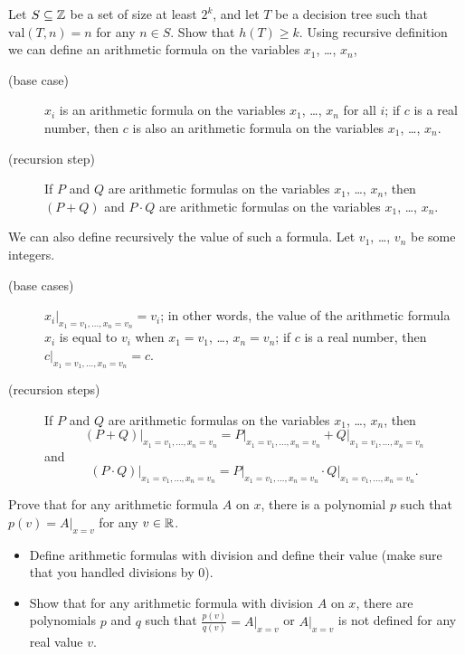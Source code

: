\begin{chapterendexercises}
  \exercise[recommended] Let $S \subseteq {\mathbb{Z}}$ be a set of size at least $2^k$,
    and let $T$ be a decision tree such that $\mathrm{val}(T, n) = n$ for any $n
    \in S$. Show that $h(T) \ge k$.
  \exercise[recommended]
    Using recursive definition we can define an arithmetic formula on the
    variables $x_1$, \dots, $x_n$,
    \begin{description}
      \item [(base case)] $x_i$ is an arithmetic formula on the variables $x_1$,
        \dots, $x_n$ for all $i$; if $c$ is a real number, then $c$ is also an
        arithmetic formula on the variables $x_1$, \dots, $x_n$.
      \item[(recursion step)] If $P$ and $Q$ are arithmetic formulas on the
        variables $x_1$, \dots, $x_n$, then $(P + Q)$ and $P \cdot Q$ are
        arithmetic formulas on the variables $x_1$, \dots, $x_n$.
    \end{description}

    We can also define recursively the value of such a formula.
    Let $v_1$, \dots, $v_n$ be some integers.
    \begin{description}
      \item[(base cases)] $x_i\big\rvert_{x_1 = v_1, \dots, x_n = v_n} = v_i$;
        in other words, the value of the arithmetic formula $x_i$ is equal to
        $v_i$ when $x_1 = v_1$, \dots, $x_n = v_n$; if $c$ is a real number,
        then $c\rvert_{x_1 = v_1, \dots, x_n = v_n} = c$.
      \item[(recursion steps)] If $P$ and $Q$ are arithmetic formulas on the
        variables $x_1$, \dots, $x_n$, then
        \[
          (P + Q)\big\rvert_{x_1 = v_1, \dots, x_n = v_n} =
          P\big\rvert_{x_1 = v_1, \dots, x_n = v_n} +
          Q\big\rvert_{x_1 = v_1, \dots, x_n = v_n}
        \]
        and
        \[
         (P \cdot Q)\big\rvert_{x_1 = v_1, \dots, x_n = v_n} =
         P\big\rvert_{x_1 = v_1, \dots, x_n = v_n} \cdot
         Q\big\rvert_{x_1 = v_1, \dots, x_n = v_n}.
        \]
      \end{description}

      Prove that for any arithmetic formula $A$ on $x$, there is a polynomial
      $p$ such that $p(v) = A\big\rvert_{x = v}$ for any $v \in {\mathbb{R}}$.
  \exercise
        \begin{itemize}
            \item Define arithmetic formulas with division and define their value (make
                sure that you handled divisions by $0$).

            \item Show that for any arithmetic formula with division $A$ on $x$,
                there are polynomials $p$ and $q$ such that $\frac{p(v)}{q(v)} =
                A\big\rvert_{x = v}$ or $A\big\rvert_{x = v}$ is not defined for
                any real value $v$.
        \end{itemize}
\end{chapterendexercises}
